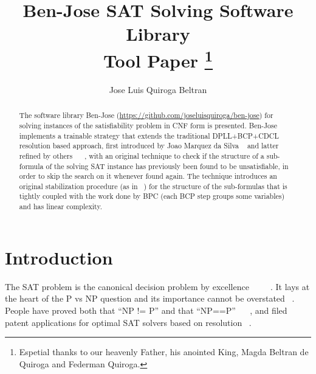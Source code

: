 \documentclass{easychair}
\title{Ben-Jose SAT Solving Software Library\\
       Tool Paper%
\thanks{Espetial thanks to our heavenly Father, his anointed King, Magda Beltran de Quiroga and Federman Quiroga.}}
\author{
Jose Luis Quiroga Beltran
}
\institute{
	Independant Researcher\\
	\email{joseluisquiroga@yahoo.com}\\
	March 2016
 }
\begin{document}
\maketitle

\begin{abstract}
The software library Ben-Jose (\url{https://github.com/joseluisquiroga/ben-jose}) for solving instances of the satisfiability problem in CNF form is presented. Ben-Jose implements a trainable strategy that extends the traditional DPLL+BCP+CDCL resolution based approach, first introduced by Joao Marquez da Silva ~\cite{silva-95} and latter refined by others ~\cite{moskewicz-01} ~\cite{een-04}, with an original technique to check if the structure of a sub-formula of the solving SAT instance has previously been found to be unsatisfiable, in order to skip the search on it whenever found again. The technique introduces an original stabilization procedure (as in ~\cite{bastert-02}) for the structure of the sub-formulas that is tightly coupled with the work done by BPC (each BCP step groups some variables) and has linear complexity.
\end{abstract}


\setcounter{tocdepth}{2}
{\small
\tableofcontents}

%
%

\pagestyle{empty}

\section{Introduction}
\label{sect:introduction}

The SAT problem is the canonical decision problem by excellence ~\cite{biere-09} ~\cite{kroening-08} ~\cite{marek-09}. It lays at the heart of the P vs NP question and its importance cannot be overstated ~\cite{cook-09}. People have proved both that “NP != P” and that “NP==P” ~\cite{woeginger-16} ~\cite{muller-13}, and filed patent applications for optimal SAT solvers based on resolution ~\cite{quiroga-01}. 
\end{document}

